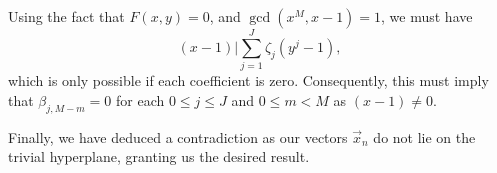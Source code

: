 Using the fact that $F(x, y) = 0$, and $\gcd(x^M, x - 1) = 1$,
we must have 
\[
    (x - 1)| \sum_{j = 1}^J \zeta_j (y^j - 1),
\]
which is only possible if each coefficient is zero.
Consequently, this must imply that $\beta_{j, M - m} = 0$ for each $0 \leq j \leq J$ and $0 \leq m < M$ as $(x - 1) \neq 0$.

Finally, we have deduced a contradiction as our vectors $\vec{x}_n$ do not lie on the trivial hyperplane, granting us the desired result.